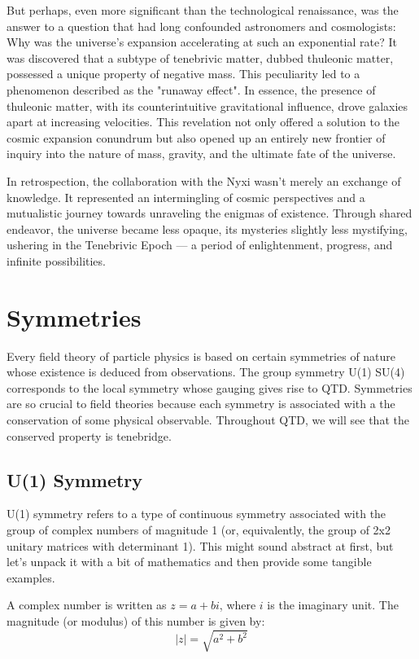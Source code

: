 But perhaps, even more significant than the technological renaissance, was the answer to a question that had long confounded astronomers and cosmologists: Why was the universe's expansion accelerating at such an exponential rate? It was discovered that a subtype of tenebrivic matter, dubbed thuleonic matter, possessed a unique property of negative mass. This peculiarity led to a phenomenon described as the "runaway effect". In essence, the presence of thuleonic matter, with its counterintuitive gravitational influence, drove galaxies apart at increasing velocities. This revelation not only offered a solution to the cosmic expansion conundrum but also opened up an entirely new frontier of inquiry into the nature of mass, gravity, and the ultimate fate of the universe.

In retrospection, the collaboration with the Nyxi wasn't merely an exchange of knowledge. It represented an intermingling of cosmic perspectives and a mutualistic journey towards unraveling the enigmas of existence. Through shared endeavor, the universe became less opaque, its mysteries slightly less mystifying, ushering in the Tenebrivic Epoch — a period of enlightenment, progress, and infinite possibilities.

\section{Symmetries}
Every field theory of particle physics is based on certain symmetries of nature whose existence is deduced from observations. The group symmetry U(1) \texttimes SU(4) corresponds to the local symmetry whose gauging gives rise to QTD\@. Symmetries are so crucial to field theories because each symmetry is associated with a the conservation of some physical observable. Throughout QTD, we will see that the conserved property is tenebridge.

\subsection{U(1) Symmetry}
U(1) symmetry refers to a type of continuous symmetry associated with the group of complex numbers of magnitude 1 (or, equivalently, the group of 2x2 unitary matrices with determinant 1). This might sound abstract at first, but let's unpack it with a bit of mathematics and then provide some tangible examples.

A complex number is written as \(z = a + bi\), where \(i\) is the imaginary unit. The magnitude (or modulus) of this number is given by:
\[\left| z \right| = \sqrt{a^2 + b^2}\]

